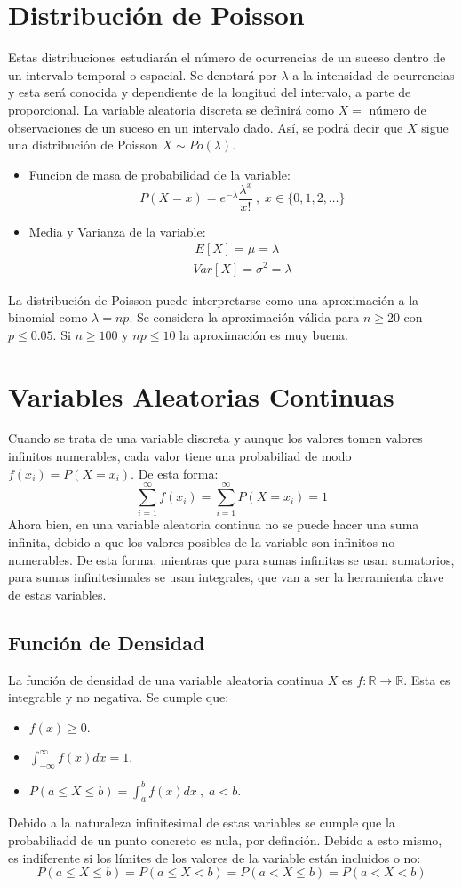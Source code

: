 \documentclass[10pt,a4paper]{book}
\begin{document}
\section{Distribución de Poisson}
Estas distribuciones estudiarán el número de ocurrencias de un suceso dentro de un intervalo temporal o espacial. Se denotará por $\lambda$ a la intensidad de ocurrencias y esta será conocida y dependiente de la longitud del intervalo, a parte de proporcional. La variable aleatoria discreta se definirá como $X=$ número de observaciones de un suceso en un intervalo dado. Así, se podrá decir que $X$ sigue una distribución de Poisson $X\sim Po(\lambda)$.
\begin{itemize}
	\item Funcion de masa de probabilidad de la variable:
		\[P(X=x) = e^{-\lambda}\frac{\lambda^x}{x!}\:,\;x\in\{0,1,2,\dots\}\]
	\item Media y Varianza de la variable:
		\[
			\begin{array}{c}
				\,E[X] = \mu = \lambda\\
				Var[X] = \sigma ^2 = \lambda
			\end{array}
		\]
\end{itemize}
La distribución de Poisson puede interpretarse como una aproximación a la binomial como $\lambda = np$. Se considera la aproximación válida para $n\geq 20$ con $p\leq 0.05$. Si $n\geq 100$ y $np\leq 10$ la aproximación es muy buena.

\section{Variables Aleatorias Continuas}
Cuando se trata de una variable discreta y aunque los valores tomen valores infinitos numerables, cada valor tiene una probabiliad de modo $f(x_i) = P(X=x_i)$. De esta forma: 
\[\sum_{i=1}^\infty f(x_i) = \sum_{i=1}^\infty P(X=x_i) = 1\]
Ahora bien, en una variable aleatoria continua no se puede hacer una suma infinita, debido a que los valores posibles de la variable son infinitos no numerables. De esta forma, mientras que para sumas infinitas se usan sumatorios, para sumas infinitesimales se usan integrales, que van a ser la herramienta clave de estas variables.
\subsection{Función de Densidad}
La función de densidad de una variable aleatoria continua $X$ es $f:\mathbb{R}\to\mathbb{R}$. Esta es integrable y no negativa. Se cumple que:
\begin{itemize}
	\item $f(x) \geq 0$.
	\item $\int_{-\infty}^\infty f(x)dx = 1$.
	\item $P(a\leq X \leq b) =\int_a^bf(x)dx\:,\;a<b$.
\end{itemize}
Debido a la naturaleza infinitesimal de estas variables se cumple que la probabiliadd de un punto concreto es nula, por definción. Debido a esto mismo, es indiferente si los límites de los valores de la variable están incluidos o no:
\[P(a\leq X\leq b) = P(a\leq X <b) = P(a<X\leq b) = P(a<X<b)\]
\end{document}
